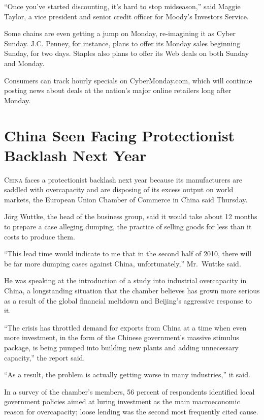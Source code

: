 ﻿\documentclass[12pt]{article}
\begin{document}
``Once you've started discounting, it's hard to stop midseason,'' said Maggie Taylor, a vice
president and senior credit officer for Moody's Investors Service.

Some chains are even getting a jump on Monday, re-imagining it as Cyber Sunday. J.C. Penney, for
instance, plans to offer its Monday sales beginning Sunday, for two days. Staples also plans to
offer its Web deals on both Sunday and Monday.

Consumers can track hourly specials on CyberMonday.com, which will continue posting news about deals
at the nation's major online retailers long after Monday.

\section{China Seen Facing Protectionist Backlash Next Year}

\lettrine{C}{hina} faces a protectionist backlash next year because its
manufacturers are saddled with overcapacity and are disposing of its excess output on world markets,
the European Union Chamber of Commerce in China said Thursday.

Jörg Wuttke, the head of the business group, said it would take about 12 months to prepare a case
alleging dumping, the practice of selling goods for less than it costs to produce them.

``This lead time would indicate to me that in the second half of 2010, there will be far more
dumping cases against China, unfortunately,'' Mr.~Wuttke said.

He was speaking at the introduction of a study into industrial overcapacity in China, a longstanding
situation that the chamber believes has grown more serious as a result of the global financial
meltdown and Beijing's aggressive response to it.

``The crisis has throttled demand for exports from China at a time when even more investment, in the
form of the Chinese government's massive stimulus package, is being pumped into building new plants
and adding unnecessary capacity,'' the report said.

``As a result, the problem is actually getting worse in many industries,'' it said.

In a survey of the chamber's members, 56 percent of respondents identified local government policies
aimed at luring investment as the main macroeconomic reason for overcapacity; loose lending was the
second most frequently cited cause.
\end{document}
